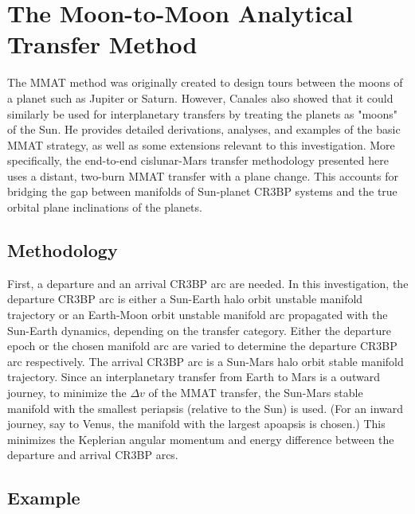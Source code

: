 \section{The Moon-to-Moon Analytical Transfer Method}
The MMAT method was originally created to design tours between the moons of a planet such as
Jupiter or Saturn. However, Canales also showed that it could similarly be used for interplanetary
transfers by treating the planets as "moons" of the Sun. He provides detailed derivations,
analyses, and examples of the basic MMAT strategy, as well as some extensions relevant to this
investigation\cite{Canales:2021a,Canales:2021b,Canales:2022}. More specifically, the end-to-end
cislunar-Mars transfer methodology presented here uses a distant, two-burn MMAT transfer with a
plane change. This accounts for bridging the gap between manifolds of Sun-planet CR3BP systems and
the true orbital plane inclinations of the planets.

\subsection{Methodology}
First, a departure and an arrival CR3BP arc are needed. In this investigation, the departure CR3BP
arc is either a Sun-Earth halo orbit unstable manifold trajectory or an Earth-Moon orbit unstable
manifold arc propagated with the Sun-Earth dynamics, depending on the transfer category. Either the
departure epoch or the chosen manifold arc are varied to determine the departure CR3BP arc
respectively. The arrival CR3BP arc is a Sun-Mars halo orbit stable manifold trajectory. Since an
interplanetary transfer from Earth to Mars is a outward journey, to minimize the $\Delta v$ of the
MMAT transfer, the Sun-Mars stable manifold with the smallest periapsis (relative to the Sun) is
used\cite{Canales:2021b}. (For an inward journey, say to Venus, the manifold with the largest
apoapsis is chosen.) This minimizes the Keplerian angular momentum and energy difference between
the departure and arrival CR3BP arcs.



\subsection{Example}
